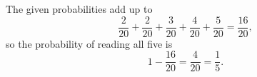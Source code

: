 The given probabilities add up to
\[\dfrac{2}{20}+\dfrac{2}{20}+\dfrac{3}{20}+\dfrac{4}{20}+\dfrac{5}{20}=\dfrac{16}{20},\]
so the probability of reading all five is
\[1-\dfrac{16}{20}=\dfrac{4}{20}=\boxed{\dfrac15}.\]
